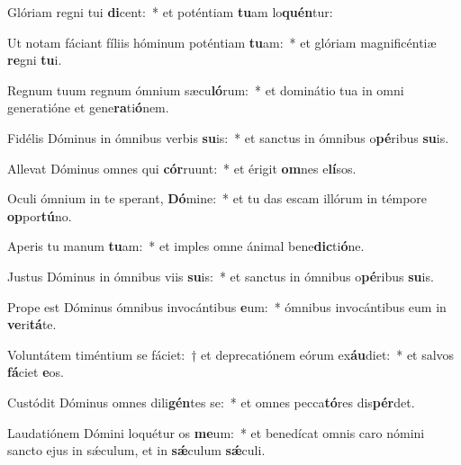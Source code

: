 \item Glóriam regni tui \textbf{di}cent:~* et poténtiam \textbf{tu}am lo\textbf{quén}tur:
\item Ut notam fáciant fíliis hóminum poténtiam \textbf{tu}am:~* et glóriam magnificéntiæ \textbf{re}gni \textbf{tu}i.
\item Regnum tuum regnum ómnium sæcu\textbf{ló}rum:~* et dominátio tua in omni generatióne et gene\textbf{ra}ti\textbf{ó}nem.
\item Fidélis Dóminus in ómnibus verbis \textbf{su}is:~* et sanctus in ómnibus o\textbf{pé}ribus \textbf{su}is.
\item Allevat Dóminus omnes qui \textbf{cór}ruunt:~* et érigit \textbf{om}nes e\textbf{lí}sos.
\item Oculi ómnium in te sperant, \textbf{Dó}mine:~* et tu das escam illórum in témpore \textbf{op}por\textbf{tú}no.
\item Aperis tu manum \textbf{tu}am:~* et imples omne ánimal bene\textbf{dic}ti\textbf{ó}ne.
\item Justus Dóminus in ómnibus viis \textbf{su}is:~* et sanctus in ómnibus o\textbf{pé}ribus \textbf{su}is.
\item Prope est Dóminus ómnibus invocántibus \textbf{e}um:~* ómnibus invocántibus eum in \textbf{ve}ri\textbf{tá}te.
\item Voluntátem timéntium se fáciet:~† et deprecatiónem eórum ex\textbf{áu}diet:~* et salvos \textbf{fá}ciet \textbf{e}os.
\item Custódit Dóminus omnes dili\textbf{gén}tes se:~* et omnes pecca\textbf{tó}res dis\textbf{pér}det.
\item Laudatiónem Dómini loquétur os \textbf{me}um:~* et benedícat omnis caro nómini sancto ejus in sǽculum, et in \textbf{sǽ}culum \textbf{sǽ}culi.
